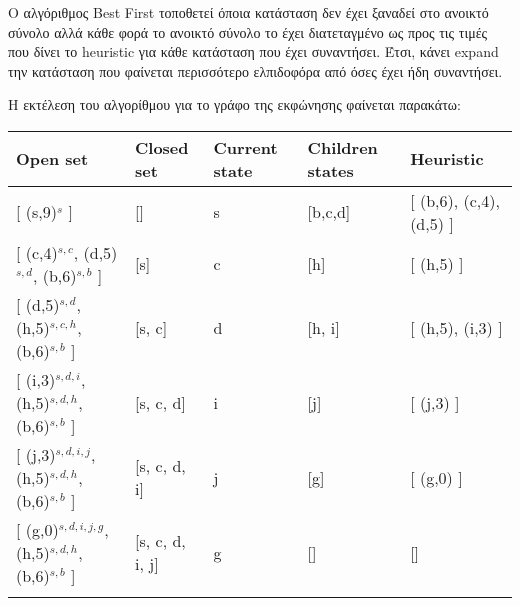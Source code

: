 \documentclass[a4paper,oneside, 11pt]{article}
\begin{document}
Ο αλγόριθμος Best First τοποθετεί όποια κατάσταση δεν έχει ξαναδεί στο ανοικτό σύνολο αλλά κάθε φορά το ανοικτό σύνολο το έχει διατεταγμένο ως προς τις τιμές που δίνει το heuristic για κάθε κατάσταση που έχει συναντήσει. Έτσι, κάνει expand την κατάσταση που φαίνεται περισσότερο ελπιδοφόρα από όσες έχει ήδη συναντήσει.

H εκτέλεση του αλγορίθμου για το γράφο της εκφώνησης φαίνεται παρακάτω:
\bigbreak 
\begin{adjustbox}{width=\textwidth,center=\textwidth}
\begin{tabular}{lllll}
	\hline
	\multicolumn{1}{|l|}{Open set} & \multicolumn{1}{l|}{Closed set} & \multicolumn{1}{l|}{Current state} & \multicolumn{1}{l|}{Children states} & \multicolumn{1}{l|}{Heuristic} \\ \hline
	{[} (s,9)$^s$ {]}                                   & {[}{]}                                           & s                                                       & {[}b,c,d{]}                                            & {[} (b,6), (c,4), (d,5) {]}             \\
	{[} (c,4)$^{s,c}$, (d,5)$^{s,d}$, (b,6)$^{s,b}$ {]}                    & {[}s{]}                                         & c                                                       & {[}h{]}                                                & {[} (h,5) {]}                           \\
	{[} (d,5)$^{s,d}$, (h,5)$^{s,c,h}$, (b,6)$^{s,b}$ {]}                    & {[}s, c{]}                                       & d                                                       & {[}h, i{]}                                             & {[} (h,5), (i,3) {]}                    \\
	{[} (i,3)$^{s,d,i}$, (h,5)$^{s,d,h}$, (b,6)$^{s,b}$ {]}                     & {[}s, c, d{]}                                    & i                                                       & {[}j{]}                                                & {[} (j,3) {]}                           \\
	{[} (j,3)$^{s,d,i,j}$, (h,5)$^{s,d,h}$, (b,6)$^{s,b}$ {]}                     & {[}s, c, d, i{]}                                 & j                                                       & {[}g{]}                                                & {[} (g,0) {]}                           \\
	{[} (g,0)$^{s,d,i,j,g}$, (h,5)$^{s,d,h}$, (b,6)$^{s,b}$ {]}                     & {[}s, c, d, i, j{]}                              & g                                                       & {[}{]}                                                 & {[}{]}                                  \\
	&                                                  &                                                         &                                                        &                                        
\end{tabular}
\end{adjustbox}
\end{document}

